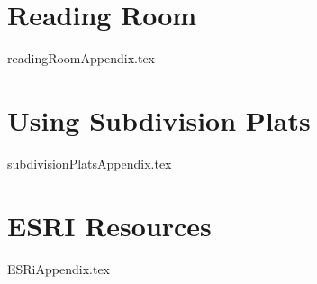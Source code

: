 
\begin{appendices}
\chapter{Reading Room}
{readingRoomAppendix.tex}
\chapter{Using Subdivision Plats}
{subdivisionPlatsAppendix.tex}
\chapter{ESRI Resources}
{ESRiAppendix.tex}
\end{appendices}

